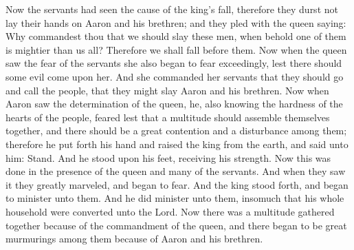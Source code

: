 Now the servants had seen the cause of the king's fall, therefore they durst not lay their hands on Aaron and his brethren; and they pled with the queen saying: Why commandest thou that we should slay these men, when behold one of them is mightier than us all? Therefore we shall fall before them.
\bverse \iffalse Now when the queen saw the fear of the servants she also began to fear exceedingly, lest there should some evil come upon her. And she commanded her servants that they should go and call the people, that they might slay Aaron and his brethren. \fi
Now when the queen saw the fear of the servants she also began to fear exceedingly, lest there should some evil come upon her. And she commanded her servants that they should go and call the people, that they might slay Aaron and his brethren.
\bverse \iffalse Now when Aaron saw the determination of the queen, he, also knowing the hardness of the hearts of the people, feared lest that a multitude should assemble themselves together, and there should be a great contention and a disturbance among them; therefore he put forth his hand and raised the king from the earth, and said unto him: Stand. And he stood upon his feet, receiving his strength. \fi
Now when Aaron saw the determination of the queen, he, also knowing the hardness of the hearts of the people, feared lest that a multitude should assemble themselves together, and there should be a great contention and a disturbance among them; therefore he put forth his hand and raised the king from the earth, and said unto him: Stand. And he stood upon his feet, receiving his strength.
\bverse \iffalse Now this was done in the presence of the queen and many of the servants. And when they saw it they greatly marveled, and began to fear. And the king stood forth, and began to minister unto them. And he did minister unto them, insomuch that his whole household were converted unto the Lord. \fi
Now this was done in the presence of the queen and many of the servants. And when they saw it they greatly marveled, and began to fear. And the king stood forth, and began to minister unto them. And he did minister unto them, insomuch that his whole household were converted unto the Lord.
\bverse \iffalse Now there was a multitude gathered together because of the commandment of the queen, and there began to be great murmurings among them because of Aaron and his brethren. \fi
Now there was a multitude gathered together because of the commandment of the queen, and there began to be great murmurings among them because of Aaron and his brethren.
